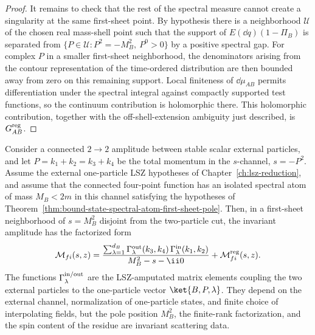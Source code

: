 \begin{proof}
It remains to check that the rest of the spectral measure cannot create a
singularity at the same first-sheet point.  By hypothesis there is a
neighborhood \(\mathcal U\) of the chosen real mass-shell point such that
the support of \(E(\dd q)(1-\Pi_B)\) is separated from
\(\{P\in\mathcal U:P^2=-M_B^2,\ P^0>0\}\) by a positive spectral gap.  For
complex \(P\) in a smaller first-sheet neighborhood, the denominators
arising from the contour representation of the time-ordered distribution
are then bounded away from zero on this remaining support.  Local finiteness
of \(\dd\mu_{AB}\) permits differentiation under the spectral integral
against compactly supported test functions, so the continuum contribution
is holomorphic there.  This holomorphic contribution, together with the
off-shell-extension ambiguity just described, is \(G_{AB}^{\rm reg}\).
\end{proof}

\begin{theorem}
\label{thm:bound-state-lsz-pole-factorization}
Consider a connected \(2\to2\) amplitude between stable scalar external
particles, and let \(P=k_1+k_2=k_3+k_4\) be the total momentum in the
\(s\)-channel, \(s=-P^2\).  Assume the external one-particle LSZ hypotheses
of Chapter~\ref{ch:lsz-reduction}, and assume that the connected
four-point function has an isolated spectral atom of mass \(M_B<2m\) in this
channel satisfying the hypotheses of
Theorem~\ref{thm:bound-state-spectral-atom-first-sheet-pole}.  Then, in a
first-sheet neighborhood of \(s=M_B^2\) disjoint from the two-particle cut,
the invariant amplitude has the factorized form
\begin{equation}
  \mathcal M_{fi}(s,z)
  =
  \frac{
    \sum_{\lambda=1}^{d_B}
      \Gamma^{\rm out}_{\lambda}(k_3,k_4)\,
      \Gamma^{\rm in}_{\lambda}(k_1,k_2)}
       {M_B^2-s-\ii0}
  +
  \mathcal M^{\rm reg}_{fi}(s,z).
  \label{eq:bound-state-lsz-pole-factorization}
\end{equation}
The functions \(\Gamma^{\rm in/out}_{\lambda}\) are the LSZ-amputated matrix
elements coupling the two external particles to the one-particle vector
\(\ket{B,P,\lambda}\).  They depend on the external channel, normalization of
one-particle states, and finite choice of interpolating fields, but the pole
position \(M_B^2\), the finite-rank factorization, and the spin content of the
residue are invariant scattering data.
\end{theorem}


